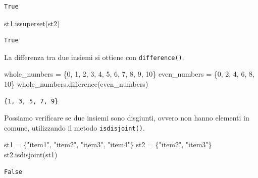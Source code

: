 \documentclass[
  letterpaper,
  krantz2]{{[}./krantz{]}}
\newenvironment{Shaded}{\begin{snugshade}}{\end{snugshade}}
\newcommand{\DecValTok}[1]{\textcolor[rgb]{0.68,0.00,0.00}{#1}}
\newcommand{\NormalTok}[1]{\textcolor[rgb]{0.00,0.23,0.31}{#1}}
\newcommand{\OperatorTok}[1]{\textcolor[rgb]{0.37,0.37,0.37}{#1}}
\newcommand{\StringTok}[1]{\textcolor[rgb]{0.13,0.47,0.30}{#1}}
\begin{document}
\begin{verbatim}
True
\end{verbatim}

\begin{Shaded}
\begin{Highlighting}[]
\NormalTok{st1.issuperset(st2) }
\end{Highlighting}
\end{Shaded}

\begin{verbatim}
True
\end{verbatim}

La differenza tra due insiemi si ottiene con \texttt{difference()}.

\begin{Shaded}
\begin{Highlighting}[]
\NormalTok{whole\_numbers }\OperatorTok{=}\NormalTok{ \{}\DecValTok{0}\NormalTok{, }\DecValTok{1}\NormalTok{, }\DecValTok{2}\NormalTok{, }\DecValTok{3}\NormalTok{, }\DecValTok{4}\NormalTok{, }\DecValTok{5}\NormalTok{, }\DecValTok{6}\NormalTok{, }\DecValTok{7}\NormalTok{, }\DecValTok{8}\NormalTok{, }\DecValTok{9}\NormalTok{, }\DecValTok{10}\NormalTok{\}}
\NormalTok{even\_numbers }\OperatorTok{=}\NormalTok{ \{}\DecValTok{0}\NormalTok{, }\DecValTok{2}\NormalTok{, }\DecValTok{4}\NormalTok{, }\DecValTok{6}\NormalTok{, }\DecValTok{8}\NormalTok{, }\DecValTok{10}\NormalTok{\}}
\NormalTok{whole\_numbers.difference(even\_numbers)}
\end{Highlighting}
\end{Shaded}

\begin{verbatim}
{1, 3, 5, 7, 9}
\end{verbatim}

Possiamo verificare se due insiemi sono disgiunti, ovvero non hanno
elementi in comune, utilizzando il metodo \texttt{isdisjoint()}.

\begin{Shaded}
\begin{Highlighting}[]
\NormalTok{st1 }\OperatorTok{=}\NormalTok{ \{}\StringTok{"item1"}\NormalTok{, }\StringTok{"item2"}\NormalTok{, }\StringTok{"item3"}\NormalTok{, }\StringTok{"item4"}\NormalTok{\}}
\NormalTok{st2 }\OperatorTok{=}\NormalTok{ \{}\StringTok{"item2"}\NormalTok{, }\StringTok{"item3"}\NormalTok{\}}
\NormalTok{st2.isdisjoint(st1)}
\end{Highlighting}
\end{Shaded}

\begin{verbatim}
False
\end{verbatim}
\end{document}
